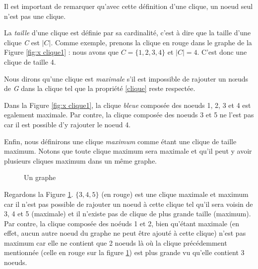 \documentclass[12pt,a4paper]{article}
\begin{document}
Il est important de remarquer qu'avec cette définition d'une clique, un noeud seul n'est pas une clique.

La \textit{taille} d'une clique est définie par sa cardinalité, c'est à dire que la taille d'une clique \emph{C} est \(|C|\). Comme exemple, prenons la clique en rouge dans le graphe de la Figure \ref{fig:x clique1} : nous avons que \(C = \{1,2,3,4\}\) et \(|C| = 4\). C'est donc une clique de taille 4.

Nous dirons qu'une clique est \textit{maximale} s'il est impossible de rajouter un nœuds de \emph{G} dans la clique tel que la propriété \eqref{clique} reste respectée.

Dans la Figure \ref{fig:x clique1}, la clique \textit{bleue} composée des noeuds 1, 2, 3 et 4 est egalement maximale. Par contre, la clique composée des noeuds 3 et 5 ne l'est pas car il est possible d'y rajouter le noeud 4.

Enfin, nous définirons une clique \textit{maximum} comme étant une clique de taille maximum. Notons que toute clique maximum sera maximale et qu'il peut y avoir plusieurs cliques maximum dans un même graphe.

\begin{figure}[h]
  \begin{center}
\caption{Un graphe}
  \label{fig:x clique2}
\end{center}
\end{figure}

Regardons la Figure \ref{fig:x clique2}. $ \{3, 4, 5\}$ (en rouge) est une clique maximale et maximum car il n'est pas possible de rajouter un noeud à cette clique tel qu'il sera voisin de 3, 4 et 5 (maximale) et il n'existe pas de clique de plus grande taille (maximum). Par contre, la clique composée des noéuds 1 et 2, bien qu'étant maximale (en effet, aucun autre noeud du graphe ne peut être ajouté à cette clique) n'est pas maximum car elle ne contient que 2 noeuds là où la clique précédemment mentionnée (celle en rouge sur la figure \ref{fig:x clique2}) est plus grande vu qu'elle contient 3 noeuds.
\end{document}
